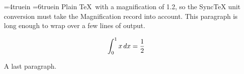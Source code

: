 \hsize=4truein \vsize=6truein
Plain \TeX\ with a magnification of 1.2, so the SyncTeX unit conversion
must take the Magnification record into account. This paragraph is long
enough to wrap over a few lines of output.

$$ \int_0^1 x\,dx = {1\over 2} $$

A last paragraph.
\bye
